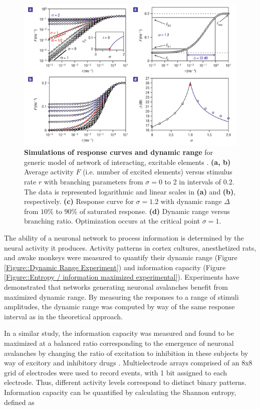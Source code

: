 \documentclass[12pt]{article}
\begin{document}
\begin{figure}      
  \begin{center}    
 \includegraphics[width=1\textwidth]{dynamicrangetheorycopelli}    
    \caption{\textbf{Simulations of response curves and dynamic range} for generic model of network of interacting, excitable elements \cite{Kinouchi2006b}. \textbf{(a, b)} Average activity $F$ (i.e. number of excited elements) versus stimulus rate $r$ with branching parameters from $\sigma = 0$ to 2 in intervals of 0.2. The data is represented logarithmic and linear scales in \textbf{(a)} and \textbf{(b)}, respectively. \textbf{(c)} Response curve for $\sigma = 1.2$ with dynamic range $\Delta$ from $10\%$ to $90\%$ of saturated response. \textbf{(d)} Dynamic range versus branching ratio. Optimization occurs at the critical point $\sigma = 1$.}
   \label{Figure::Dynamic Range Theory}   
  \end{center}     
   \end{figure}

The ability of a neuronal network to process information is determined by the neural activity it produces. Activity patterns in cortex cultures, anesthetized rats, and awake monkeys were measured to quantify their dynamic range (Figure \ref{Figure::Dynamic Range Experiment}) and information capacity (Figure \ref{Figure::Entropy / information maximized experimental}). Experiments have demonstrated that networks generating neuronal avalanches benefit from maximized dynamic range\cite{Shew2009b}. By measuring the responses to a range of stimuli amplitudes, the dynamic range was computed by way of the same response interval as in the theoretical approach.
   
In a similar study, the information capacity was measured and found to be maximized at a balanced ratio corresponding to the emergence of neuronal avalanches by changing the ratio of excitation to inhibition in these subjects by way of excitory and inhibitory drugs \cite{Shew2011a}. Multielectrode arrays comprised of an 8x8 grid of electrodes were used to record events, with 1 bit assigned to each electrode. Thus, different activity levels correspond to distinct binary patterns. Information capacity can be quantified by calculating the Shannon entropy, defined as
\end{document}
